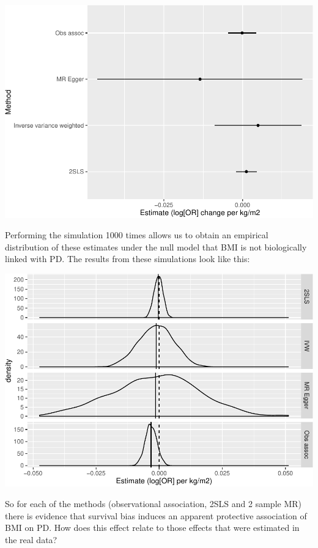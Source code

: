 \documentclass[]{article}
\begin{document}
\includegraphics{images/example_mr-1.pdf}

Performing the simulation 1000 times allows us to obtain an empirical
distribution of these estimates under the null model that BMI is not
biologically linked with PD. The results from these simulations look
like this:

\includegraphics{images/method_comparisons_model1-1.pdf}

So for each of the methods (observational association, 2SLS and 2 sample
MR) there is evidence that survival bias induces an apparent protective
association of BMI on PD. How does this effect relate to those effects
that were estimated in the real data?
\end{document}
